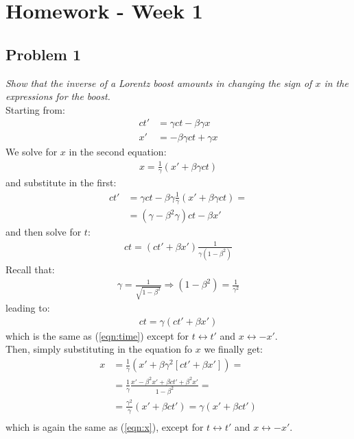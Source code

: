 \documentclass[../template.tex]{subfiles}
\begin{document}
\section{Homework - Week 1}

\subsection{Problem 1}
\textit{Show that the inverse of a Lorentz boost amounts in changing the sign of $x$ in the expressions for the boost.}\\
Starting from:
\begin{align}\label{eqn:time}
    ct' &=  \gamma ct- \beta \gamma x \\
    x' &= -\beta \gamma ct + \gamma x \label{eqn:x}
\end{align} 
We solve for $x$ in the second equation:
\begin{align*}
    x = \frac{1}{\gamma} (x' + \beta \gamma c t) 
\end{align*}
and substitute in the first:
\begin{align*}
    ct' &= \gamma c t - \beta \gamma\frac{1}{\gamma} (x' + \beta \gamma c t) = \\
    &=  (\gamma - \beta^2 \gamma ) ct - \beta x' 
\end{align*}
and then solve for $t$:
\begin{align*}
    ct = (ct' + \beta x') \frac{1}{\gamma (1-\beta^2)} 
\end{align*} 
Recall that:
\begin{align*}
    \gamma = \frac{1}{\sqrt{1-\beta^2}} \Rightarrow (1-\beta^2) = \frac{1}{\gamma^2} 
\end{align*}
leading to:
\begin{align*}
    ct = \gamma(ct' + \beta x')
\end{align*}
which is the same as (\ref{eqn:time}) except for $t \leftrightarrow t'$ and $x \leftrightarrow -x'$.\\
Then, simply substituting in the equation fo $x$ we finally get:
\begin{align*}
    x &= \frac{1}{\gamma}(x' + \beta \gamma^2 [ct' + \beta x']) = \\
    &=  \frac{1}{\gamma} \frac{x' - \beta^2 x' + \beta ct' + \beta^2 x'}{1-\beta^2} = \\
    &= \frac{\gamma^2}{\gamma} (x' + \beta ct') = \gamma (x' + \beta ct')  \\
\end{align*}  
which is again the same as (\ref{eqn:x}), except for $t \leftrightarrow t'$ and $x \leftrightarrow -x'$.\\
\end{document}
